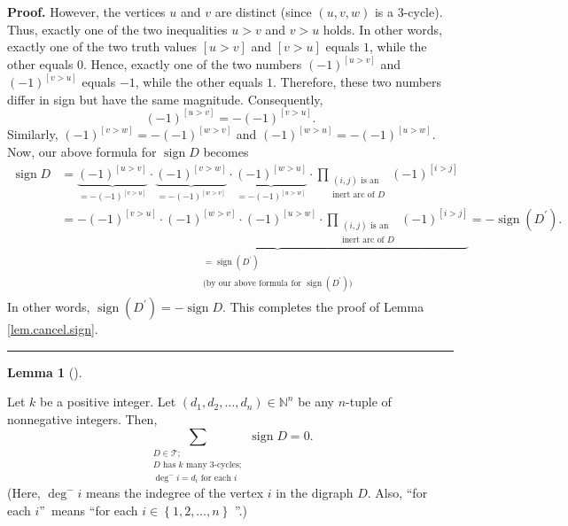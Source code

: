 \documentclass[numbers=enddot,12pt,final,onecolumn,notitlepage]{scrartcl}%
\numberwithin{exer}{subsection}
\theoremstyle{definition}
\newtheorem{lem}[theo]{Lemma}
\newenvironment{lemma}[1][]
{\begin{lem}[#1]\begin{leftbar}}
{\end{leftbar}\end{lem}}
\newenvironment{proof}[1][Proof]{\noindent\textbf{#1.} }{\ \rule{0.5em}{0.5em}}
\let\sumnonlimits\sum
\let\prodnonlimits\prod
\renewcommand{\sum}{\sumnonlimits\limits}
\renewcommand{\prod}{\prodnonlimits\limits}
\begin{document}
\begin{proof}
However, the vertices $u$ and $v$ are distinct (since $\left(  u,v,w\right)  $
is a $3$-cycle). Thus, exactly one of the two inequalities $u>v$ and $v>u$
holds. In other words, exactly one of the two truth values $\left[
u>v\right]  $ and $\left[  v>u\right]  $ equals $1$, while the other equals
$0$. Hence, exactly one of the two numbers $\left(  -1\right)  ^{\left[
u>v\right]  }$ and $\left(  -1\right)  ^{\left[  v>u\right]  }$ equals $-1$,
while the other equals $1$. Therefore, these two numbers differ in sign but
have the same magnitude. Consequently,%
\[
\left(  -1\right)  ^{\left[  u>v\right]  }=-\left(  -1\right)  ^{\left[
v>u\right]  }.
\]
Similarly, $\left(  -1\right)  ^{\left[  v>w\right]  }=-\left(  -1\right)
^{\left[  w>v\right]  }$ and $\left(  -1\right)  ^{\left[  w>u\right]
}=-\left(  -1\right)  ^{\left[  u>w\right]  }$. Now, our above formula for
$\operatorname*{sign}D$ becomes%
\begin{align*}
\operatorname*{sign}D  &  =\underbrace{\left(  -1\right)  ^{\left[
u>v\right]  }}_{=-\left(  -1\right)  ^{\left[  v>u\right]  }}\cdot
\underbrace{\left(  -1\right)  ^{\left[  v>w\right]  }}_{=-\left(  -1\right)
^{\left[  w>v\right]  }}\cdot\underbrace{\left(  -1\right)  ^{\left[
w>u\right]  }}_{=-\left(  -1\right)  ^{\left[  u>w\right]  }}\cdot
\prod_{\substack{\left(  i,j\right)  \text{ is an}\\\text{inert arc of }%
D}}\left(  -1\right)  ^{\left[  i>j\right]  }\\
&  =-\underbrace{\left(  -1\right)  ^{\left[  v>u\right]  }\cdot\left(
-1\right)  ^{\left[  w>v\right]  }\cdot\left(  -1\right)  ^{\left[
u>w\right]  }\cdot\prod_{\substack{\left(  i,j\right)  \text{ is
an}\\\text{inert arc of }D}}\left(  -1\right)  ^{\left[  i>j\right]  }%
}_{\substack{=\operatorname*{sign}\left(  D^{\prime}\right)  \\\text{(by our
above formula for }\operatorname*{sign}\left(  D^{\prime}\right)  \text{)}%
}}=-\operatorname*{sign}\left(  D^{\prime}\right)  .
\end{align*}
In other words, $\operatorname*{sign}\left(  D^{\prime}\right)
=-\operatorname*{sign}D$. This completes the proof of Lemma
\ref{lem.cancel.sign}.
\end{proof}

\begin{lemma}
\label{lem.cancel.1}Let $k$ be a positive integer. Let $\left(  d_{1}%
,d_{2},\ldots,d_{n}\right)  \in\mathbb{N}^{n}$ be any $n$-tuple of nonnegative
integers. Then,%
\[
\sum_{\substack{D\in\mathcal{T};\\D\text{ has }k\text{ many }3\text{-cycles}%
;\\\deg^{-}i=d_{i}\text{ for each }i}}\operatorname*{sign}D=0.
\]
(Here, $\deg^{-}i$ means the indegree of the vertex $i$ in the digraph $D$.
Also, \textquotedblleft for each $i$\textquotedblright\ means
\textquotedblleft for each $i\in\left\{  1,2,\ldots,n\right\}  $%
\textquotedblright.)
\end{lemma}
\end{document}
